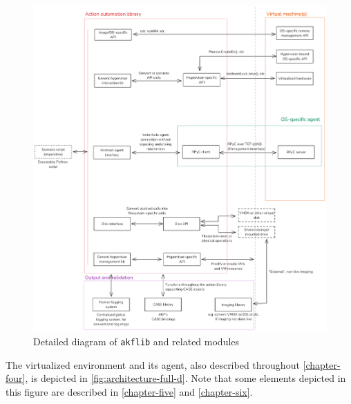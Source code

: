 \documentclass[letterpaper,12pt]{report}
\newcommand{\passthrough}[1]{#1}
\begin{document}
\begin{figure}[htbp]
\centering
\includegraphics[width=1\linewidth]{architecture-full-b.png}
\caption{Detailed diagram of \passthrough{\lstinline!akflib!} and
related modules}\label{fig:architecture-full-b}
\end{figure}

The virtualized environment and its agent, also described throughout
\autoref{chapter-four}, is depicted in
\autoref{fig:architecture-full-d}. Note that some elements depicted in
this figure are described in \autoref{chapter-five} and
\autoref{chapter-six}.
\end{document}
